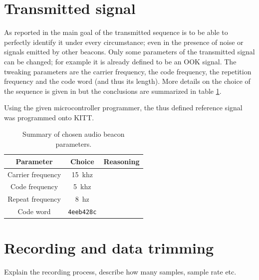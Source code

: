 \documentclass[11pt,titlepage]{report}
\begin{document}
\section{Transmitted signal}
\label{sec:loc_transmit}
As reported in \cite{epo4-del7} the main goal of the transmitted sequence is to be able to perfectly identify it under every circumstance; even in the presence of noise or signals emitted by other beacons. Only some parameters of the transmitted signal can be changed; for example it is already defined to be an OOK signal. The tweaking parameters are the carrier frequency, the code frequency, the repetition frequency and the code word (and thus its length). More details on the choice of the sequence is given in \cite{epo4-del7} but the conclusions are summarized in table \ref{tab:loc_signal}.

Using the given microcontroller programmer, the thus defined reference signal was programmed onto KITT.

\begin{table}[H]
\centering
\begin{tabular}{c | c | c}
\hline \hline
Parameter & Choice & Reasoning \\
\hline
Carrier frequency & \SI{15}{khz} & \\
Code frequency & \SI{5}{khz} & \\
Repeat frequency & \SI{8}{hz} & \\
Code word & \texttt{4eeb428c} & \\
\end{tabular}
\caption{Summary of chosen audio beacon parameters.}
\label{tab:loc_signal}
\end{table}

\section{Recording and data trimming}
\label{sec:loc_data_trim}
Explain the recording process, describe how many samples, sample rate etc.
\end{document}

